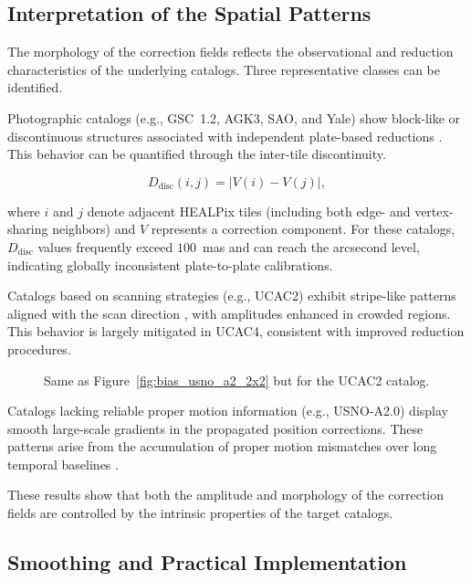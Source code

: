 \documentclass[linenumbers,amsmath,manuscript]{aastex702}
\begin{document}
\subsection{Interpretation of the Spatial Patterns} \label{subsec:interpretation}

The morphology of the correction fields reflects the observational and reduction characteristics of the underlying catalogs. Three representative classes can be identified.

Photographic catalogs (e.g., GSC~1.2, AGK3, SAO, and Yale) show block-like or discontinuous structures associated with independent plate-based reductions \citep{Platais1998,Eichhorn1974}. This behavior can be quantified through the inter-tile discontinuity.

\begin{equation}
D_{\mathrm{disc}}(i,j)=|V(i)-V(j)|,
\end{equation}

where $i$ and $j$ denote adjacent HEALPix tiles (including both edge- and vertex-sharing neighbors) and $V$ represents a correction component. For these catalogs, $D_{\mathrm{disc}}$ values frequently exceed $100$~mas and can reach the arcsecond level, indicating globally inconsistent plate-to-plate calibrations.

Catalogs based on scanning strategies (e.g., UCAC2) exhibit stripe-like patterns aligned with the scan direction \citep{Zacharias2017UCAC5}, with amplitudes enhanced in crowded regions. This behavior is largely mitigated in UCAC4, consistent with improved reduction procedures.

\begin{figure}[ht!]
\caption{Same as Figure~\ref{fig:bias_usno_a2_2x2} but for the UCAC2 catalog.}
\label{fig:bias_ucac2_2x2}
\end{figure}

Catalogs lacking reliable proper motion information (e.g., USNO-A2.0) display smooth large-scale gradients in the propagated position corrections. These patterns arise from the accumulation of proper motion mismatches over long temporal baselines \citep{Vasiliev2019}.

These results show that both the amplitude and morphology of the correction fields are controlled by the intrinsic properties of the target catalogs.

\subsection{Smoothing and Practical Implementation} \label{subsec:smoothing}
\end{document}
